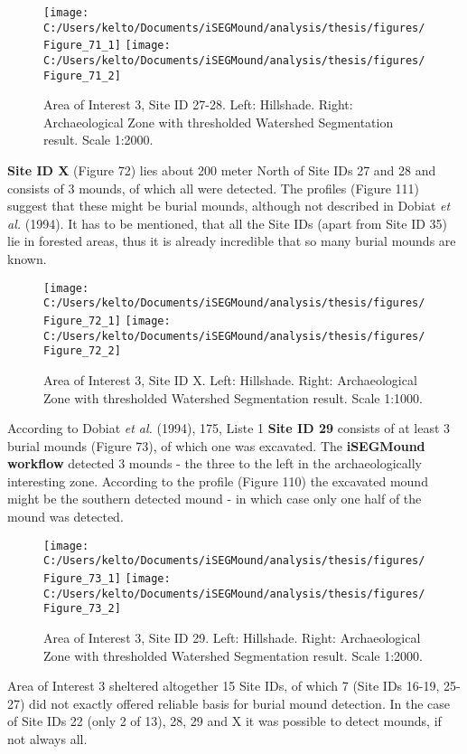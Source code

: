 \documentclass[
  12pt,
]{article}
\begin{document}
\begin{figure}
\texttt{[image: C:/Users/kelto/Documents/iSEGMound/analysis/thesis/figures/Figure\_71\_1]} \texttt{[image: C:/Users/kelto/Documents/iSEGMound/analysis/thesis/figures/Figure\_71\_2]} \caption{Area of Interest 3, Site ID 27-28. Left: Hillshade. Right: Archaeological Zone with thresholded Watershed Segmentation result. Scale 1:2000.}\label{fig:Figure71}
\end{figure}

\textbf{Site ID X} (Figure 72) lies about 200 meter North of Site IDs 27 and 28 and consists of 3 mounds, of which all were detected. The profiles (Figure 111) suggest that these might be burial mounds, although not described in Dobiat \emph{et al.} (1994). It has to be mentioned, that all the Site IDs (apart from Site ID 35) lie in forested areas, thus it is already incredible that so many burial mounds are known.

\begin{figure}
\texttt{[image: C:/Users/kelto/Documents/iSEGMound/analysis/thesis/figures/Figure\_72\_1]} \texttt{[image: C:/Users/kelto/Documents/iSEGMound/analysis/thesis/figures/Figure\_72\_2]} \caption{Area of Interest 3, Site ID X. Left: Hillshade. Right: Archaeological Zone with thresholded Watershed Segmentation result. Scale 1:1000.}\label{fig:Figure72}
\end{figure}

According to Dobiat \emph{et al.} (1994), 175, Liste 1 \textbf{Site ID 29} consists of at least 3 burial mounds (Figure 73), of which one was excavated. The \textbf{iSEGMound workflow} detected 3 mounds - the three to the left in the archaeologically interesting zone. According to the profile (Figure 110) the excavated mound might be the southern detected mound - in which case only one half of the mound was detected.

\begin{figure}
\texttt{[image: C:/Users/kelto/Documents/iSEGMound/analysis/thesis/figures/Figure\_73\_1]} \texttt{[image: C:/Users/kelto/Documents/iSEGMound/analysis/thesis/figures/Figure\_73\_2]} \caption{Area of Interest 3, Site ID 29. Left: Hillshade. Right: Archaeological Zone with thresholded Watershed Segmentation result. Scale 1:2000.}\label{fig:Figure73}
\end{figure}

Area of Interest 3 sheltered altogether 15 Site IDs, of which 7 (Site IDs 16-19, 25-27) did not exactly offered reliable basis for burial mound detection. In the case of Site IDs 22 (only 2 of 13), 28, 29 and X it was possible to detect mounds, if not always all.
\end{document}
